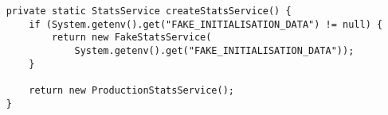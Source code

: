 \begin{verbatim}
    private static StatsService createStatsService() {
        if (System.getenv().get("FAKE_INITIALISATION_DATA") != null) {
            return new FakeStatsService(
                System.getenv().get("FAKE_INITIALISATION_DATA"));
        }
    
        return new ProductionStatsService();
    }
\end{verbatim}